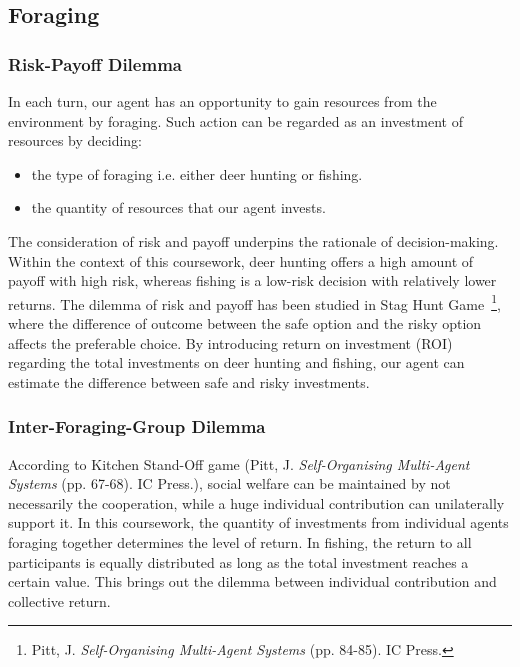 
\subsection{Foraging} \label{subsec:Team6_Foraging}
\subsubsection{Risk-Payoff Dilemma} \label{subsubsec:Team6_Foraging:RP_dilemma}
In each turn, our agent has an opportunity to gain resources from the environment by foraging. Such action can be regarded as an investment of resources by deciding:
\begin{itemize}
    \item the type of foraging i.e. either deer hunting or fishing.
    \item the quantity of resources that our agent invests.
\end{itemize}
The consideration of risk and payoff underpins the rationale of decision-making. Within the context of this coursework, deer hunting offers a high amount of payoff with high risk, whereas fishing is a low-risk decision with relatively lower returns. The dilemma of risk and payoff has been studied in Stag Hunt Game~\footnote{Pitt, J. \textit{Self-Organising Multi-Agent Systems} (pp. 84-85). IC Press.}, where the difference of outcome between the safe option and the risky option affects the preferable choice. By introducing return on investment (ROI) regarding the total investments on deer hunting and fishing, our agent can estimate the difference between safe and risky investments.

\subsubsection{Inter-Foraging-Group Dilemma} \label{subsubsec:Team6_Foraging:Group_dilemma}

According to Kitchen Stand-Off game (Pitt, J. \textit{Self-Organising Multi-Agent Systems} (pp. 67-68). IC Press.), social welfare can be maintained by not necessarily the cooperation, while a huge individual contribution can unilaterally support it. In this coursework, the quantity of investments from individual agents foraging together determines the level of return. In fishing, the return to all participants is equally distributed as long as the total investment reaches a certain value. This brings out the dilemma between individual contribution and collective return. 

